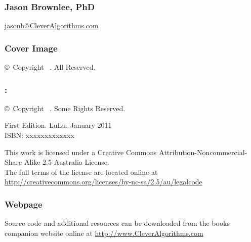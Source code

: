 
\newpage
\begin{flushleft}
\begin{small}

\vspace*{\fill}

\subsubsection*{Jason Brownlee, PhD}
\url{jasonb@CleverAlgorithms.com} \\
\vspace{0.5cm}


\subsubsection*{Cover Image}
\copyright\ Copyright \mybookdate\ \mybookauthor. All Reserved. \\
\vspace{0.5cm}


\subsubsection*{\mybooktitle: \mybooksubtitle}
\copyright\ Copyright \mybookdate\ \mybookauthor. Some Rights Reserved. \\
\vspace{0.5cm}

First Edition. LuLu. January 2011 \\
ISBN: xxxxxxxxxxxxx \\
\vspace{0.5cm}

This work is licensed under a Creative Commons Attribution\--Noncommercial\--Share Alike 2.5 Australia License. \\
The full terms of the license are located online at \url{http://creativecommons.org/licenses/by-nc-sa/2.5/au/legalcode} \\
\vspace{0.5cm}

\subsubsection*{Webpage}
Source code and additional resources can be downloaded from the books companion website online at \url{http://www.CleverAlgorithms.com}



\end{small}
\end{flushleft}
